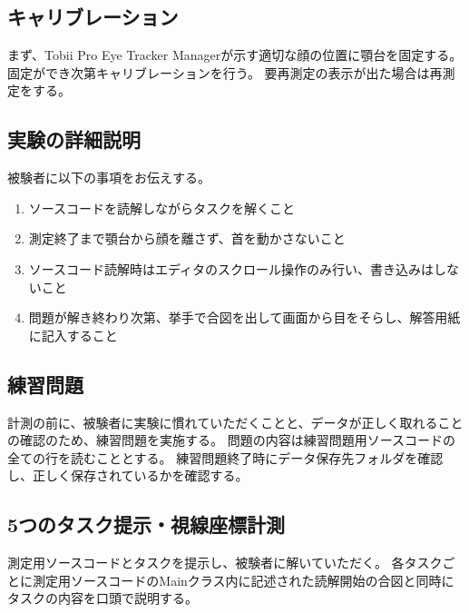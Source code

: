 \documentclass[paper=a4paper,fontsize=11pt]{jlreq}
\begin{document}
    \subsection{キャリブレーション}
      まず、Tobii Pro Eye Tracker Managerが示す適切な顔の位置に顎台を固定する。
      固定ができ次第キャリブレーションを行う。
      要再測定の表示が出た場合は再測定をする。

    \subsection{実験の詳細説明}
      被験者に以下の事項をお伝えする。
      \begin{enumerate}
        \item ソースコードを読解しながらタスクを解くこと
        \item 測定終了まで顎台から顔を離さず、首を動かさないこと
        \item ソースコード読解時はエディタのスクロール操作のみ行い、書き込みはしないこと
        \item 問題が解き終わり次第、挙手で合図を出して画面から目をそらし、解答用紙に記入すること
      \end{enumerate}
    
    \subsection{練習問題}
      計測の前に、被験者に実験に慣れていただくことと、データが正しく取れることの確認のため、練習問題を実施する。
      問題の内容は練習問題用ソースコードの全ての行を読むこととする。
      練習問題終了時にデータ保存先フォルダを確認し、正しく保存されているかを確認する。

    \subsection{5つのタスク提示・視線座標計測}
      測定用ソースコードとタスクを提示し、被験者に解いていただく。
      各タスクごとに測定用ソースコードのMainクラス内に記述された読解開始の合図と同時にタスクの内容を口頭で説明する。
  \clearpage
\end{document}
